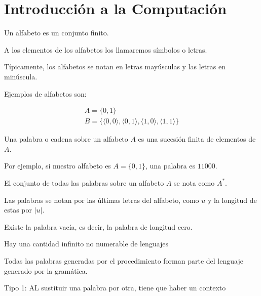 \chapter{Introducción a la Computación}


\begin{definicion}
    Un alfabeto es un conjunto finito.
\end{definicion}

A los elementos de los alfabetos los llamaremos símbolos o letras.  

Típicamente, los alfabetos se notan en letras mayúsculas y las letras en minúscula.

\begin{ejemplo}
    Ejemplos de alfabetos son:

    \begin{gather*}
        A = \{0, 1\} \\
        B = \{ \langle 0,0 \rangle , \langle 0,1 \rangle , \langle 1,0 \rangle , \langle 1,1 \rangle \}
    \end{gather*}
\end{ejemplo}


\begin{definicion}
    Una palabra o cadena sobre un alfabeto $A$ es una sucesión finita de elementos de $A$.
\end{definicion}
\begin{ejemplo}
    Por ejemplo, si nuestro alfabeto es $A = \{0,1\}$, una palabra es $11000$.
\end{ejemplo}

\begin{definicion}
    El conjunto de todas las palabras sobre un alfabeto $A$ se nota como $A^*$.
\end{definicion}
Las palabras se notan por las últimas letras del alfabeto, como $u$ y la longitud de estas por $|u|$.

\begin{definicion}
Existe la palabra vacía, es decir, la palabra de longitud cero.    
\end{definicion}


Hay una cantidad infinito no numerable de lenguajes

Todas las palabras generadas por el procedimiento forman parte del lenguaje generado por la gramática.

Tipo 1: AL sustituir una palabra por otra, tiene que haber un contexto
